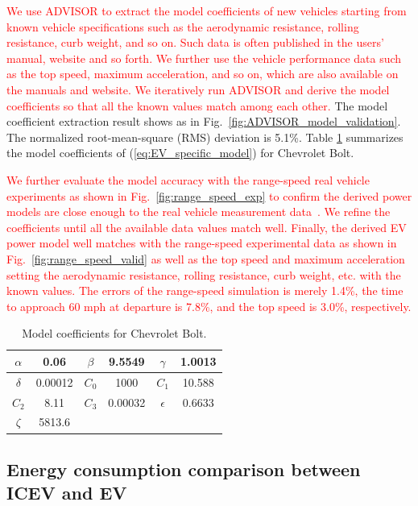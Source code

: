 \documentclass{IEEEtran}
\begin{document}
\textcolor{red}{We use ADVISOR to extract the model coefficients of new vehicles starting from known vehicle specifications such as the aerodynamic resistance, rolling resistance, curb weight, and so on. Such data is often published in the users' manual, website and so forth. We further use the vehicle performance data such as the top speed, maximum acceleration, and so on, which are also available on the manuals and website. We iteratively run ADVISOR and derive the model coefficients so that all the known values match among each other.}
The model coefficient extraction result shows as in Fig.~\ref{fig:ADVISOR_model_validation}. The normalized root-mean-square (RMS) deviation is 5.1\%. Table \ref{table:Coeff_Bolt} summarizes the model coefficients of (\ref{eq:EV_specific_model}) for Chevrolet Bolt. 

\textcolor{red}{We further evaluate the model accuracy with the range-speed real vehicle experiments as shown in Fig.~\ref{fig:range_speed_exp} to confirm the derived power models are close enough to the real vehicle measurement data~\cite{GM_Bolt:range25mph,GM_Bolt:range65mph,GM_Bolt:range75mph,GM_Bolt:range93mph,GM_Bolt:range_speed}. We  refine the coefficients until all the available data values match well. Finally, the derived EV power model well matches with the range-speed experimental data as shown in Fig.~\ref{fig:range_speed_valid} as well as the top speed and maximum acceleration setting the aerodynamic resistance, rolling resistance, curb weight, etc. with the known values. The errors of the range-speed simulation is merely 1.4\%, the time to approach 60 mph at departure is 7.8\%, and the top speed is 3.0\%, respectively.} 

\begin{table}
\caption{Model coefficients for Chevrolet Bolt.}
\label{table:Coeff_Bolt}
\centering
\begin{tabular}{|c|c|c|c|c|c|}  \hline
$\alpha$	&0.06		&$\beta$	&9.5549	&$\gamma$	&1.0013	\\ \hline
$\delta$	&0.00012 		&$C_0$	&1000 	&$C_1$		&10.588	\\ \hline
$C_2$	&8.11		&$C_3$	&0.00032	&$\epsilon$	&0.6633	\\ \hline
$\zeta$	&5813.6		\\ \cline{1-2}
\end{tabular}
\end{table}

\subsection{Energy consumption comparison between ICEV and EV} \label{subsec:comparison}
\end{document}
